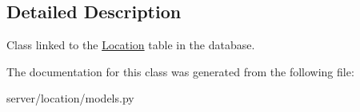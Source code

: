 \subsection{Detailed Description}
Class linked to the \hyperlink{classlocation_1_1models_1_1Location}{Location} table in the database. 

The documentation for this class was generated from the following file\-:\begin{DoxyCompactItemize}
\item 
server/location/models.\-py\end{DoxyCompactItemize}
